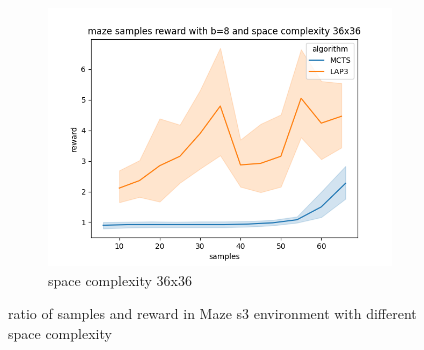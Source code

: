 \documentclass[bibliography=totoc]{scrartcl}
\begin{document}
\begin{figure}[h!]
    \begin{subfigure}[b]{0.3\linewidth}
        \includegraphics[width=\linewidth]{img/maze_samples__reward_b_8_LAP3_MCTS_36.png}
        \caption{space complexity 36x36}
    \end{subfigure}
    \caption{ratio of samples and reward in Maze s3 environment with different space complexity}
    \label{fig:known_problems}
\end{figure}
\end{document}
